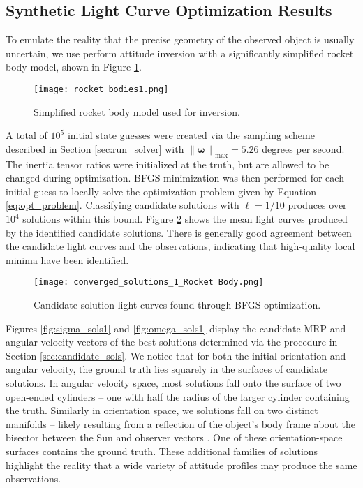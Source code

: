 \documentclass[a4paper,twocolumn]{spaceDebrisC} %
\newcommand{\vctr}[1]{\bm{#1}}
\newcommand{\norm}[1]{\left\lVert#1\right\rVert}
\newcommand{\figmed}[0]{0.4\textwidth}
\begin{document}
\subsection{Synthetic Light Curve Optimization Results}

To emulate the reality that the precise geometry of the observed object is usually uncertain, we use perform attitude inversion with a significantly simplified rocket body model, shown in Figure \ref{fig:inv_model}.

\begin{figure}[H]
  \centering
  \texttt{[image: rocket\_bodies1.png]}
  \caption{Simplified rocket body model used for inversion.}
  \label{fig:inv_model}
\end{figure}

A total of $10^5$ initial state guesses were created via the sampling scheme described in Section \ref{sec:run_solver} with $\norm{\vctr{\omega}}_\text{max}=5.26$ degrees per second. The inertia tensor ratios were initialized at the truth, but are allowed to be changed during optimization. BFGS minimization was then performed for each initial guess to locally solve the optimization problem given by Equation \ref{eq:opt_problem}. Classifying candidate solutions with $\ell = 1/10$ produces over $10^4$ solutions within this bound. Figure \ref{fig:conv_lcs_synth} shows the mean light curves produced by the identified candidate solutions. There is generally good agreement between the candidate light curves and the observations, indicating that high-quality local minima have been identified.

\begin{figure}[H]
  \centering
  \texttt{[image: converged\_solutions\_1\_Rocket Body.png]}
  \caption{Candidate solution light curves found through BFGS optimization.}
  \label{fig:conv_lcs_synth}
\end{figure}

Figures \ref{fig:sigma_sols1} and \ref{fig:omega_sols1} display the candidate MRP and angular velocity vectors of the best solutions determined via the procedure in Section \ref{sec:candidate_sols}. We notice that for both the initial orientation and angular velocity, the ground truth lies squarely in the surfaces of candidate solutions. In angular velocity space, most solutions fall onto the surface of two open-ended cylinders -- one with half the radius of the larger cylinder containing the truth. Similarly in orientation space, we solutions fall on two distinct manifolds -- likely resulting from a reflection of the object's body frame about the bisector between the Sun and observer vectors \cite{marto2024, burton2024journal}. One of these orientation-space surfaces contains the ground truth. These additional families of solutions highlight the reality that a wide variety of attitude profiles may produce the same observations.
\end{document}

